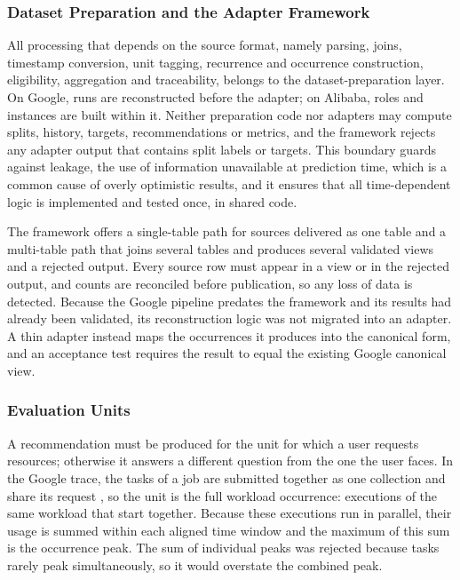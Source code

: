 \subsubsection{Dataset Preparation and the Adapter Framework}\label{sec:4.1.3}

All processing that depends on the source format, namely parsing, joins, timestamp conversion, unit tagging, recurrence and occurrence construction, eligibility, aggregation and traceability, belongs to the dataset-preparation layer. On Google, runs are reconstructed before the adapter; on Alibaba, roles and instances are built within it. Neither preparation code nor adapters may compute splits, history, targets, recommendations or metrics, and the framework rejects any adapter output that contains split labels or targets. This boundary guards against leakage, the use of information unavailable at prediction time, which is a common cause of overly optimistic results, and it ensures that all time-dependent logic is implemented and tested once, in shared code.

The framework offers a single-table path for sources delivered as one table and a multi-table path that joins several tables and produces several validated views and a rejected output. Every source row must appear in a view or in the rejected output, and counts are reconciled before publication, so any loss of data is detected. Because the Google pipeline predates the framework and its results had already been validated, its reconstruction logic was not migrated into an adapter. A thin adapter instead maps the occurrences it produces into the canonical form, and an acceptance test requires the result to equal the existing Google canonical view.

\subsubsection{Evaluation Units}\label{sec:4.1.4}

A recommendation must be produced for the unit for which a user requests resources; otherwise it answers a different question from the one the user faces. In the Google trace, the tasks of a job are submitted together as one collection and share its request \cite{ref7}, so the unit is the full workload occurrence: executions of the same workload that start together. Because these executions run in parallel, their usage is summed within each aligned time window and the maximum of this sum is the occurrence peak. The sum of individual peaks was rejected because tasks rarely peak simultaneously, so it would overstate the combined peak.

